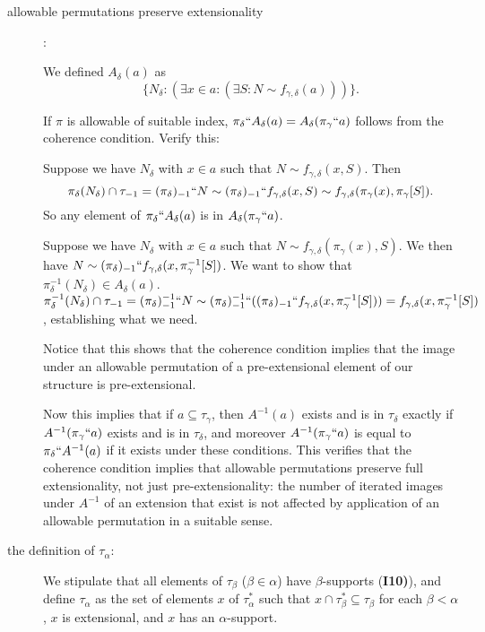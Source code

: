 \documentclass[112pt]{article}
\begin{document}
\begin{description}
\item[allowable permutations preserve extensionality]:

  We defined $A_\delta(a)$ as $$\{N_\delta:(\exists x \in a:(\exists S:N \sim f_{\gamma,\delta}(a)))\}.$$

If $\pi$ is allowable of suitable index, $\pi_\delta``A_\delta(a)= A_\delta(\pi_\gamma``a)$ follows from the coherence condition.  Verify this:

Suppose we have $N_\delta$ with $x \in a$ such that $N \sim f_{\gamma,\delta}(x,S)$.  Then $$\pi_\delta(N_\delta)  \cap \tau_{-1} = (\pi_\delta)_{-1}``N \sim (\pi_\delta)_{-1}``f_{\gamma,\delta}(x,S) \sim f_{\gamma,\delta}(\pi_\gamma(x),\pi_\gamma[S]).$$  So any element of $\pi_\delta``A_\delta(a)$ is in $A_\delta(\pi_\gamma``a)$.

Suppose we have $N_\delta$ with $x \in a$ such that $N \sim f_{\gamma,\delta}(\pi_\gamma(x),S)$.  We then have $N \sim (\pi_\delta)_{-1}``f_{\gamma,\delta}(x,\pi_\gamma^{-1}[S])$.  We want to show that $\pi_\delta^{-1}(N_\delta) \in A_\delta(a)$.  $\pi_\delta^{-1}(N_\delta) \cap \tau_{-1} = (\pi_\delta)_{-1}^{-1}``N \sim 
(\pi_\delta)_{-1}^{-1}``((\pi_\delta)_{-1}``f_{\gamma,\delta}(x,\pi_\gamma^{-1}[S])) = f_{\gamma,\delta}(x,\pi_\gamma^{-1}[S])$, establishing what we need.

Notice that this shows that the coherence condition implies that the image under an allowable permutation of a pre-extensional element of our structure is pre-extensional.

Now this implies that if $a \subseteq \tau_\gamma$, then $A^{-1}(a)$ exists and is in $\tau_\delta$ exactly if $A^{-1}(\pi_\gamma``a)$ exists and is in $\tau_\delta$, and moreover $A^{-1}(\pi_\gamma``a)$ is equal to $\pi_\delta``A^{-1}(a)$ if it exists under these conditions.  This verifies that the coherence condition implies that allowable permutations preserve full extensionality, not just pre-extensionality:  the number of iterated images under $A^{-1}$ of an extension that exist is not affected by application of an allowable permutation in a suitable sense.



\item[the definition of $\tau_\alpha$:]  We stipulate that all elements of $\tau_\beta$ ($\beta\in \alpha$) have $\beta$-supports ({\bf I10)}), and define $\tau_\alpha$ as the set of elements $x$ of $\tau^*_\alpha$ such that
$x \cap \tau^*_{\beta} \subseteq \tau_\beta$ for each $\beta<\alpha$, $x$ is extensional, and $x$ has an $\alpha$-support.


\end{description}
\end{document}
